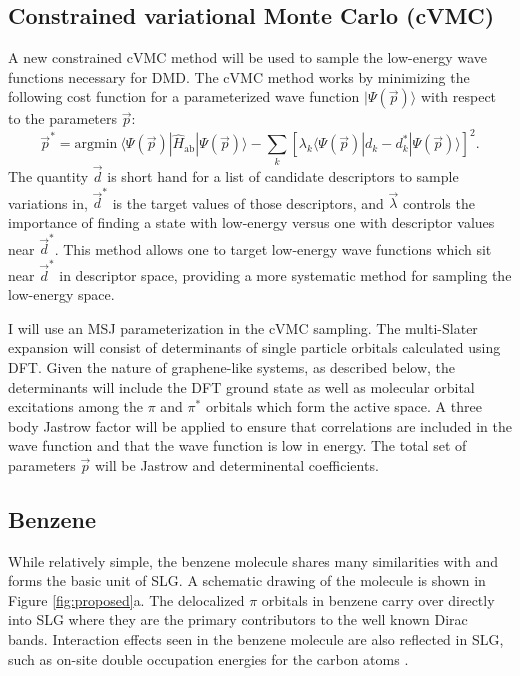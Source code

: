 \documentclass[12pt]{article}
\begin{document}
\subsection{Constrained variational Monte Carlo (cVMC)}
A new constrained cVMC method will be used to sample the low-energy wave functions necessary for DMD.
The cVMC method works by minimizing the following cost function for a parameterized wave function $|\Psi(\vec{p})\rangle$ with respect to the parameters $\vec{p}$:
\begin{equation}
\vec{p}^* = \text{argmin} \ \langle \Psi(\vec{p}) | \hat{H}_\text{ab} | \Psi(\vec{p}) \rangle - \sum_k [\lambda_k \langle \Psi(\vec{p}) | d_k - d_{k}^* | \Psi(\vec{p}) \rangle]^2.
\end{equation}
The quantity $\vec{d}$ is short hand for a list of candidate descriptors to sample variations in, $\vec{d}^*$ is the target values of those descriptors, and $\vec{\lambda}$ controls the importance of finding a state with low-energy versus one with descriptor values near $\vec{d}^*$.
This method allows one to target low-energy wave functions which sit near $\vec{d}^*$ in descriptor space, providing a more systematic method for sampling the low-energy space.

I will use an MSJ parameterization in the cVMC sampling.
The multi-Slater expansion will consist of determinants of single particle orbitals calculated using DFT.
Given the nature of graphene-like systems, as described below, the determinants will include the DFT ground state as well as molecular orbital excitations among the $\pi$ and $\pi^*$ orbitals which form the active space.
A three body Jastrow factor will be applied to ensure that correlations are included in the wave function and that the wave function is low in energy.
The total set of parameters $\vec{p}$ will be Jastrow and determinental coefficients.

\subsection{Benzene}
While relatively simple, the benzene molecule shares many similarities with and forms the basic unit of SLG.
A schematic drawing of the molecule is shown in Figure \ref{fig:proposed}a.
The delocalized $\pi$ orbitals in benzene carry over directly into SLG where they are the primary contributors to the well known Dirac bands.
Interaction effects seen in the benzene molecule are also reflected in SLG, such as on-site double occupation energies for the carbon atoms \cite{Zheng2017, Wagner2015}.
\end{document}

